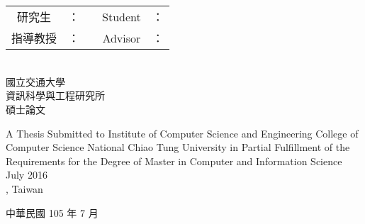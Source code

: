 \begin{titlepage}
  \begin{center}
    \LARGE \chineseTitle{}  \\
    \LARGE \englishTitle{}  \\[1.5cm]

    \Large
    \begin{tabular}{c l c c l}
    研究生   & ：\studentCnName{} & \hspace{0.5cm}  & Student  & ：\studentEnName{} \\
    指導教授 & ：\advisorCnName{} & \hspace{0.5cm}  & Advisor  & ：\advisorEnName{}\\
    \end{tabular}
    \\[1.5cm]
    國立交通大學 \\
    資訊科學與工程研究所 \\
    碩士論文 \\[1cm]

    \begin{singlespace}
    A Thesis Submitted to Institute of Computer Science and Engineering College of Computer Science National Chiao Tung University in Partial Fulfillment of the Requirements for the Degree of Master in Computer and Information Science \\
    July 2016 \\
    \studentEnName{}, Taiwan \\
    \end{singlespace}

  \end{center}

  \vspace{\fill}

  \begin{center}
    {\LARGE 中華民國  105 年 7 月}
  \end{center}
\end{titlepage}
